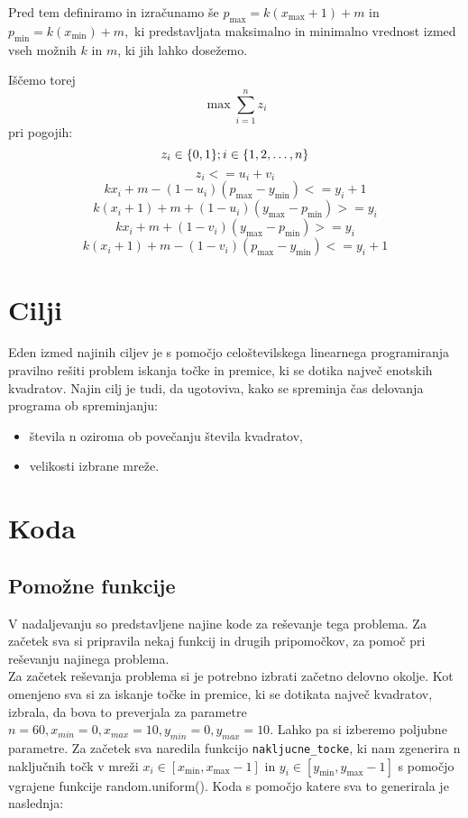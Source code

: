 \documentclass[a4paper]{article}
\begin{document}
Pred tem definiramo in izračunamo še $p_{\max} = k (x_{\max}+1)+m$ in $p_{\min} = k (x_{\min})+m,$ ki predstavljata maksimalno in minimalno vrednost izmed vseh možnih $k$ in $m$, ki jih lahko dosežemo. 

Iščemo torej \\
$$\max\sum_{i=1}^n z_{i} $$
pri pogojih:\\
$$z_{i} \in \{0,1\}; i \in \{1, 2, \dots, n\}\\$$
$$z_i <= u_i + v_i$$   
$$k x_i + m - (1 - u_i) (p_{\max} - y_{\min}) <= y_i + 1$$
$$k (x_i+1) + m + (1 - u_i) (y_{\max} - p_{\min}) >= y_i $$
$$k x_i + m + (1 - v_i) (y_{\max} - p_{\min}) >= y_i$$
$$k (x_i+1) + m - (1 - v_i) (p_{\max} - y_{\min}) <= y_i + 1$$

\section{Cilji}

Eden izmed najinih ciljev je s pomočjo celoštevilskega linearnega programiranja pravilno rešiti problem iskanja točke in premice, ki se dotika največ enotskih kvadratov.
Najin cilj je tudi, da ugotoviva, kako se spreminja čas delovanja programa ob spreminjanju:

\begin{itemize}
\item{števila n oziroma ob povečanju števila kvadratov,}
\item{velikosti izbrane mreže.}
\end{itemize}

\section{Koda}

\subsection{Pomožne funkcije}

V nadaljevanju so predstavljene najine kode za reševanje tega problema. Za začetek sva si pripravila nekaj funkcij in drugih pripomočkov, za pomoč pri reševanju najinega problema.
\\
Za začetek reševanja problema si je potrebno izbrati začetno delovno okolje. Kot omenjeno sva si za iskanje točke in premice, ki se dotikata največ kvadratov, izbrala, da bova to preverjala za parametre $n = 60, x_{min} = 0, x_{max} = 10, y_{min} = 0, y_{max} = 10.$ Lahko pa si izberemo poljubne parametre.
Za začetek sva naredila funkcijo \texttt{nakljucne\_tocke}, ki nam zgenerira n naključnih točk v mreži $x_i \in [x_{\min}, x_{\max}-1]$  in $y_i \in [y_{\min}, y_{\max}-1]$ s pomočjo vgrajene funkcije random.uniform(). Koda s pomočjo katere sva to generirala je naslednja:
\end{document}
